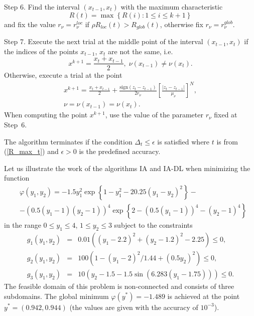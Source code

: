 \documentclass[twocolumn]{svjour3}          %
\begin{document}
	Step 6. Find the interval $(x_{t-1}, x_t)$ with the maximum characteristic
\begin{equation}\label{R_max_t}
	R(t) = \max{\left\{ R(i): 1 \leq i \leq k+1\right\}}
\end{equation}
and fix the value $r_{\nu}=r_{\nu}^{loc}$ if $\rho R_{loc}(t) > R_{glob}(t)$, otherwise fix $r_{\nu}=r_{\nu}^{glob}$.

	Step 7. Execute the next trial at the middle point of the interval $(x_{t-1}, x_t)$ if the indices of the points $x_{t-1}$, $x_t$ are not the same, i.e.
$$
	x^{k+1} = \frac{x_t + x_{t-1}}{2}, \; \nu(x_{t-1}) \neq \nu(x_t).
$$
Otherwise, execute a trial at the point
\begin{eqnarray*}
	x^{k+1} = \frac{x_t+x_{t-1}}{2} + \frac{\mathrm{sign}(z_t-z_{t-1})}{2r_\nu}\left[\frac{\left|z_t-z_{t-1}\right|}{\mu_\nu}\right]^N, \\
	\nu = \nu(x_{t-1})=\nu(x_t).
\end{eqnarray*}
When computing the point $x^{k+1}$, use the value of the parameter $r_{\nu}$ fixed at Step~6. 

The algorithm terminates if the condition $\Delta_{t} \leq \epsilon$ is satisfied where $t$ is from (\ref{R_max_t}) and $\epsilon>0$ is the predefined accuracy.

	Let us illustrate the work of the algorithms IA and IA-DL when minimizing the function
\small
\begin{align*}
	&\varphi(y_1, y_2) = -1.5y_1^2\exp{\left\{1-y_1^2-20.25(y_1-y_2)^2\right\}}-\\
	& -\left(0.5(y_1-1)(y_2-1)\right)^4 \exp{\left\{2-\left(0.5(y_1-1)\right)^4-(y_2-1)^4\right\}}
\end{align*}
\normalsize
in the range $0 \leq y_1 \leq 4$, $1 \leq y_2 \leq 3$ subject to the constraints
\small
\begin{eqnarray*}
	g_1(y_1, y_2) & = & 0.01 \left( (y_1-2.2)^2+(y_2-1.2)^2-2.25 \right) \leq 0, \\
	g_2(y_1, y_2) & = & 100 \left(1-(y_1-2)^2/1.44+(0.5y_2)^2 \right) \leq 0, \\
	g_3(y_1, y_2) & = & 10 \left( y_2 - 1.5 - 1.5 \sin{\left( 6.283(y_1-1.75) \right)}\right) \leq 0.
\end{eqnarray*}
\normalsize
The feasible domain of this problem is non-connected and consists of three subdomains. The global minimum $\varphi(y^\ast)=-1.489$ is achieved at the point \\ $y^\ast =(0.942, 0.944)$ (the values are given with the accuracy of $10^{-3}$).
\end{document}
